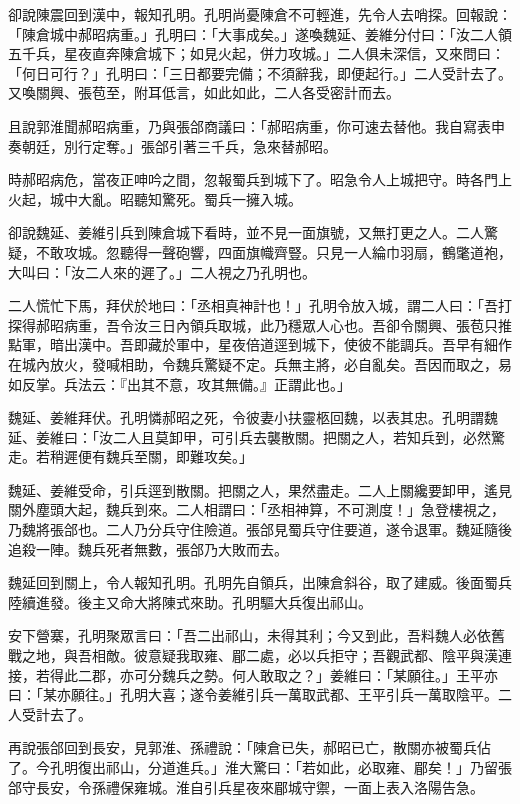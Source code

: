 卻說陳震回到漢中，報知孔明。孔明尚憂陳倉不可輕進，先令人去哨探。回報說：「陳倉城中郝昭病重。」孔明曰：「大事成矣。」遂喚魏延、姜維分付曰：「汝二人領五千兵，星夜直奔陳倉城下；如見火起，併力攻城。」二人俱未深信，又來問曰：「何日可行？」孔明曰：「三日都要完備；不須辭我，即便起行。」二人受計去了。又喚關興、張苞至，附耳低言，如此如此，二人各受密計而去。

且說郭淮聞郝昭病重，乃與張郃商議曰：「郝昭病重，你可速去替他。我自寫表申奏朝廷，別行定奪。」張郃引著三千兵，急來替郝昭。

時郝昭病危，當夜正呻吟之間，忽報蜀兵到城下了。昭急令人上城把守。時各門上火起，城中大亂。昭聽知驚死。蜀兵一擁入城。

卻說魏延、姜維引兵到陳倉城下看時，並不見一面旗號，又無打更之人。二人驚疑，不敢攻城。忽聽得一聲砲響，四面旗幟齊豎。只見一人綸巾羽扇，鶴氅道袍，大叫曰：「汝二人來的遲了。」二人視之乃孔明也。

二人慌忙下馬，拜伏於地曰：「丞相真神計也！」孔明令放入城，謂二人曰：「吾打探得郝昭病重，吾令汝三日內領兵取城，此乃穩眾人心也。吾卻令關興、張苞只推點軍，暗出漢中。吾即藏於軍中，星夜倍道逕到城下，使彼不能調兵。吾早有細作在城內放火，發喊相助，令魏兵驚疑不定。兵無主將，必自亂矣。吾因而取之，易如反掌。兵法云：『出其不意，攻其無備。』正謂此也。」

魏延、姜維拜伏。孔明憐郝昭之死，令彼妻小扶靈柩回魏，以表其忠。孔明謂魏延、姜維曰：「汝二人且莫卸甲，可引兵去襲散關。把關之人，若知兵到，必然驚走。若稍遲便有魏兵至關，即難攻矣。」

魏延、姜維受命，引兵逕到散關。把關之人，果然盡走。二人上關纔要卸甲，遙見關外塵頭大起，魏兵到來。二人相謂曰：「丞相神算，不可測度！」急登樓視之，乃魏將張郃也。二人乃分兵守住險道。張郃見蜀兵守住要道，遂令退軍。魏延隨後追殺一陣。魏兵死者無數，張郃乃大敗而去。

魏延回到關上，令人報知孔明。孔明先自領兵，出陳倉斜谷，取了建威。後面蜀兵陸續進發。後主又命大將陳式來助。孔明驅大兵復出祁山。

安下營寨，孔明聚眾言曰：「吾二出祁山，未得其利；今又到此，吾料魏人必依舊戰之地，與吾相敵。彼意疑我取雍、郿二處，必以兵拒守；吾觀武都、陰平與漢連接，若得此二郡，亦可分魏兵之勢。何人敢取之？」姜維曰：「某願往。」王平亦曰：「某亦願往。」孔明大喜；遂令姜維引兵一萬取武都、王平引兵一萬取陰平。二人受計去了。

再說張郃回到長安，見郭淮、孫禮說：「陳倉已失，郝昭已亡，散關亦被蜀兵佔了。今孔明復出祁山，分道進兵。」淮大驚曰：「若如此，必取雍、郿矣！」乃留張郃守長安，令孫禮保雍城。淮自引兵星夜來郿城守禦，一面上表入洛陽告急。

